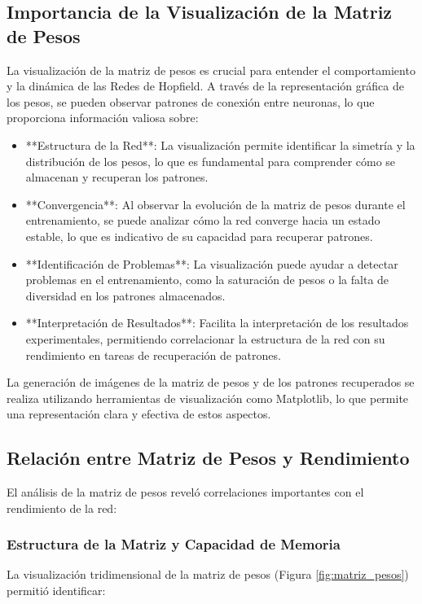 \documentclass{article}
\begin{document}
\subsection{Importancia de la Visualización de la Matriz de Pesos}
La visualización de la matriz de pesos es crucial para entender el comportamiento y la dinámica de las Redes de Hopfield. A través de la representación gráfica de los pesos, se pueden observar patrones de conexión entre neuronas, lo que proporciona información valiosa sobre:

\begin{itemize}
    \item **Estructura de la Red**: La visualización permite identificar la simetría y la distribución de los pesos, lo que es fundamental para comprender cómo se almacenan y recuperan los patrones.
    \item **Convergencia**: Al observar la evolución de la matriz de pesos durante el entrenamiento, se puede analizar cómo la red converge hacia un estado estable, lo que es indicativo de su capacidad para recuperar patrones.
    \item **Identificación de Problemas**: La visualización puede ayudar a detectar problemas en el entrenamiento, como la saturación de pesos o la falta de diversidad en los patrones almacenados.
    \item **Interpretación de Resultados**: Facilita la interpretación de los resultados experimentales, permitiendo correlacionar la estructura de la red con su rendimiento en tareas de recuperación de patrones.
\end{itemize}

La generación de imágenes de la matriz de pesos y de los patrones recuperados se realiza utilizando herramientas de visualización como Matplotlib, lo que permite una representación clara y efectiva de estos aspectos.

\subsection{Relación entre Matriz de Pesos y Rendimiento}
El análisis de la matriz de pesos reveló correlaciones importantes con el rendimiento de la red:

\subsubsection{Estructura de la Matriz y Capacidad de Memoria}
La visualización tridimensional de la matriz de pesos (Figura \ref{fig:matriz_pesos}) permitió identificar:
\end{document}
